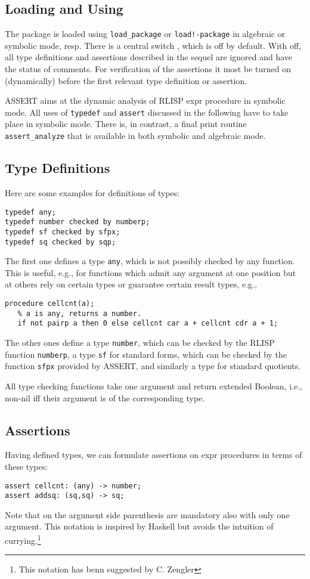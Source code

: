
\subsection{Loading and Using}
The package is loaded using \texttt{load\_package} or
\texttt{load!-package} in algebraic or symbolic mode, resp. There is a
central switch , which is off by default. With
 off, all type definitions and assertions described
in the sequel are ignored and have the status of comments. For
verification of the assertions it most be turned on (dynamically) before
the first relevant type definition or assertion.

ASSERT aims at the dynamic analysis of RLISP expr procedure in symbolic
mode. All uses of \texttt{typedef} and \texttt{assert} discussed in the
following have to take place in symbolic mode. There is, in contrast, a
final print routine \texttt{assert\_analyze} that is available in both
symbolic and algebraic mode.

\subsection{Type Definitions}
Here are some examples for definitions of types:
\begin{verbatim}
typedef any;
typedef number checked by numberp;
typedef sf checked by sfpx;
typedef sq checked by sqp;
\end{verbatim}
The first one defines a type \texttt{any}, which is not possibly checked
by any function. This is useful, e.g., for functions which admit any
argument at one position but at others rely on certain types or
guarantee certain result types, e.g.,
\begin{verbatim}
procedure cellcnt(a);
   % a is any, returns a number.
   if not pairp a then 0 else cellcnt car a + cellcnt cdr a + 1;
\end{verbatim}

The other ones define a type \texttt{number}, which can be checked by
the RLISP function \texttt{numberp}, a type \texttt{sf} for standard
forms, which can be checked by the function \texttt{sfpx} provided by
ASSERT, and similarly a type for standard quotients.

All type checking functions take one argument and return extended
Boolean, i.e., non-nil iff their argument is of the corresponding type.

\subsection{Assertions}
Having defined types, we can formulate assertions on expr procedures in
terms of these types:
\begin{verbatim}
assert cellcnt: (any) -> number;
assert addsq: (sq,sq) -> sq;
\end{verbatim}
Note that on the argument side parenthesis are mandatory also with only
one argument. This notation is inspired by Haskell but avoids the
intuition of currying.\footnote{This notation has benn suggested by C. Zengler}

